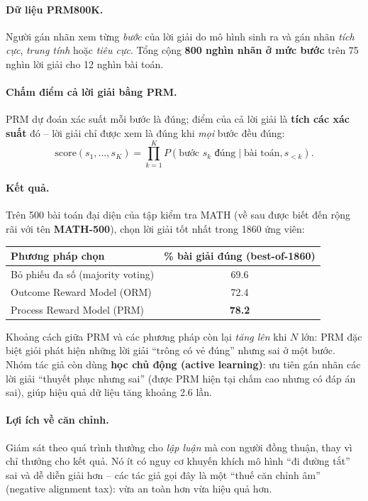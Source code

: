 \paragraph{Dữ liệu PRM800K.} Người gán nhãn xem từng \emph{bước} của lời giải do mô hình sinh ra và gán nhãn \emph{tích cực}, \emph{trung tính} hoặc \emph{tiêu cực}. Tổng cộng \textbf{800 nghìn nhãn ở mức bước} trên 75 nghìn lời giải cho 12 nghìn bài toán.

\paragraph{Chấm điểm cả lời giải bằng PRM.} PRM dự đoán xác suất mỗi bước là đúng; điểm của cả lời giải là \textbf{tích các xác suất} đó -- lời giải chỉ được xem là đúng khi \emph{mọi} bước đều đúng:
\[
\text{score}(s_1, \dots, s_K) = \prod_{k=1}^{K} P(\text{bước } s_k \text{ đúng} \mid \text{bài toán}, s_{<k}).
\]

\paragraph{Kết quả.} Trên 500 bài toán đại diện của tập kiểm tra MATH (về sau được biết đến rộng rãi với tên \textbf{MATH-500}), chọn lời giải tốt nhất trong 1860 ứng viên:
\begin{center}
\begin{tabular}{@{}lc@{}}
\toprule
\textbf{Phương pháp chọn} & \textbf{\% bài giải đúng (best-of-1860)} \\
\midrule
Bỏ phiếu đa số (majority voting) & 69.6 \\
Outcome Reward Model (ORM) & 72.4 \\
Process Reward Model (PRM) & \textbf{78.2} \\
\bottomrule
\end{tabular}
\end{center}
Khoảng cách giữa PRM và các phương pháp còn lại \emph{tăng lên} khi $N$ lớn: PRM đặc biệt giỏi phát hiện những lời giải “trông có vẻ đúng” nhưng sai ở một bước. Nhóm tác giả còn dùng \textbf{học chủ động (active learning)}: ưu tiên gán nhãn các lời giải “thuyết phục nhưng sai” (được PRM hiện tại chấm cao nhưng có đáp án sai), giúp hiệu quả dữ liệu tăng khoảng 2.6 lần.

\paragraph{Lợi ích về căn chỉnh.} Giám sát theo quá trình thưởng cho \emph{lập luận} mà con người đồng thuận, thay vì chỉ thưởng cho kết quả. Nó ít có nguy cơ khuyến khích mô hình “đi đường tắt” sai và dễ diễn giải hơn -- các tác giả gọi đây là một “thuế căn chỉnh âm” (negative alignment tax): vừa an toàn hơn vừa hiệu quả hơn.

